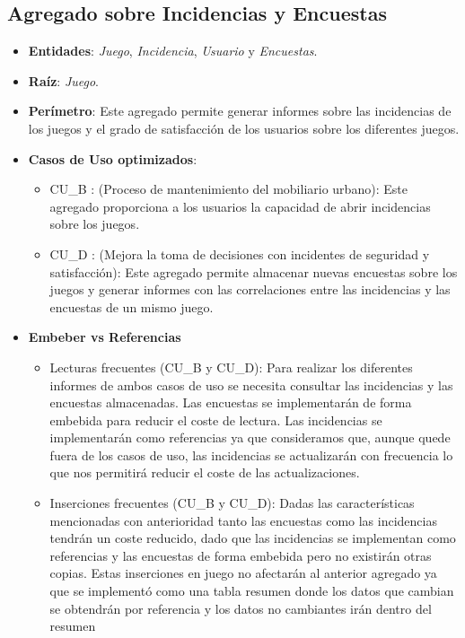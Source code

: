 \documentclass[]{article}
\begin{document}
\subsection{Agregado sobre Incidencias y Encuestas}
\label{sub_sec:agregado_inserciones_encuestas}
\begin{itemize}
    \item \textbf{Entidades}: \textit{Juego}, \textit{Incidencia}, \textit{Usuario} y \textit{Encuestas}.
    \item \textbf{Raíz}: \textit{Juego}.
    \item \textbf{Perímetro}: Este agregado permite generar informes sobre las incidencias de los juegos y el grado de satisfacción de los usuarios sobre los diferentes juegos.
    \item \textbf{Casos de Uso optimizados}:
    \begin{itemize}
        \item CU\_B : (Proceso de mantenimiento del mobiliario urbano): Este agregado proporciona a los usuarios la capacidad de abrir incidencias sobre los juegos.
        \item CU\_D : (Mejora la toma de decisiones con incidentes de seguridad y satisfacción): Este agregado permite almacenar nuevas encuestas sobre los juegos y generar informes con las correlaciones entre las incidencias y las encuestas de un mismo juego. 
    \end{itemize}
    \item \textbf{Embeber vs Referencias}
    \begin{itemize}
        \item Lecturas frecuentes (CU\_B y CU\_D): Para realizar los diferentes informes de ambos casos de uso se necesita consultar las incidencias y las encuestas almacenadas. Las encuestas se implementarán de forma embebida para reducir el coste de lectura. Las incidencias se implementarán como referencias ya que consideramos que, aunque quede fuera de los casos de uso, las incidencias se actualizarán con frecuencia lo que nos permitirá reducir el coste de las actualizaciones. 
        \item Inserciones frecuentes (CU\_B y CU\_D): Dadas las características mencionadas con anterioridad tanto las encuestas como las incidencias tendrán un coste reducido, dado que las incidencias se implementan como referencias y las encuestas de forma embebida pero no existirán otras copias. Estas inserciones en juego no afectarán al anterior agregado ya que se implementó como una tabla resumen donde los datos que cambian se obtendrán por referencia y los datos no cambiantes irán dentro del resumen
    \end{itemize}
\end{itemize}
\end{document}
